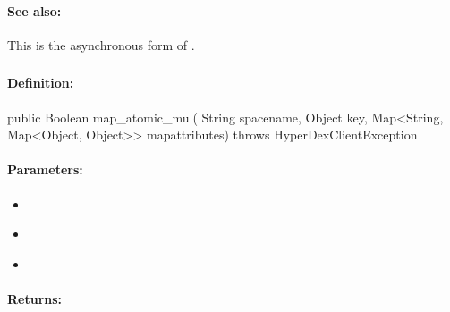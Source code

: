 \paragraph{See also:}  This is the asynchronous form of .

\pagebreak
\subsubsection{}
\label{api:java:map_atomic_mul}


\paragraph{Definition:}
\begin{javacode}
public Boolean map_atomic_mul(
        String spacename,
        Object key,
        Map<String, Map<Object, Object>> mapattributes) throws HyperDexClientException
\end{javacode}

\paragraph{Parameters:}
\begin{itemize}[noitemsep]
\item {}\\

\item {}\\

\item {}\\

\end{itemize}

\paragraph{Returns:}


\pagebreak
\subsubsection{}
\label{api:java:async_map_atomic_mul}


